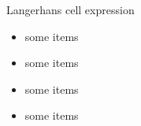 \documentclass[final,hyperref={pdfpagelabels=false}]{beamer}
\begin{document}
\begin{frame}{}
\begin{columns}[t]
\begin{column}{.25\linewidth}
\begin{block}{Langerhans cell expression}
          \begin{itemize}
          \item some items
          \item some items
          \item some items
          \item some items
          \end{itemize}
        \end{block}
      \end{column}


    \end{columns}
  \end{frame}
\end{document}

